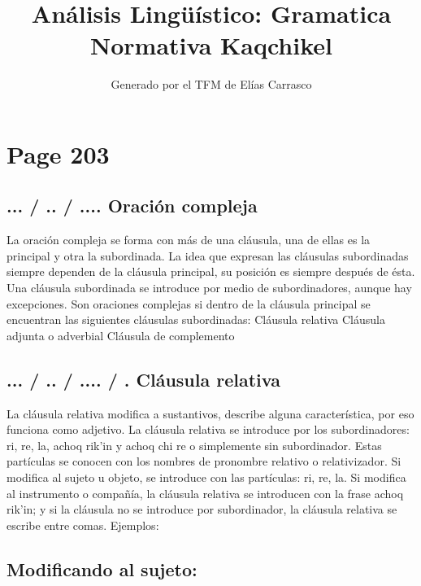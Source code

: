 \documentclass{article}%
\title{Análisis Lingüístico: Gramatica Normativa Kaqchikel}%
\author{Generado por el TFM de Elías Carrasco}%
\begin{document}
%
\normalsize%
\maketitle%
\section{Page 203}%
\label{sec:Page203}%
\subsection{... / .. / .... Oración compleja}%
\label{subsec:.../../....Oracincompleja}%

%
La oración compleja se forma con más de una cláusula, una de ellas es la principal y %
otra la subordinada. La idea que expresan las cláusulas subordinadas siempre dependen %
de la cláusula principal, su posición es siempre después de ésta. Una cláusula subordinada %
se introduce por medio de subordinadores, aunque hay excepciones. Son oraciones %
complejas si dentro de la cláusula principal se encuentran las siguientes cláusulas %
subordinadas: %
Cláusula relativa %
Cláusula adjunta o adverbial %
Cláusula de complemento %
\subsection{... / .. / .... / . Cláusula relativa}%
\label{subsec:.../../..../.Clusularelativa}%

%
La cláusula relativa modifica a sustantivos, describe alguna característica, por eso %
funciona como adjetivo. La cláusula relativa se introduce por los subordinadores: ri, %
re, la, achoq rik'in y achoq chi re o simplemente sin subordinador. Estas partículas se %
conocen con los nombres de pronombre relativo o relativizador. Si modifica al sujeto u %
objeto, se introduce con las partículas: ri, re, la. Si modifica al instrumento o compañía, %
la cláusula relativa se introducen con la frase achoq rik'in; y si la cláusula no se %
introduce por subordinador, la cláusula relativa se escribe entre comas. Ejemplos: %
\subsection{Modificando al sujeto:}%
\label{subsec:Modificandoalsujeto}%
\end{document}
